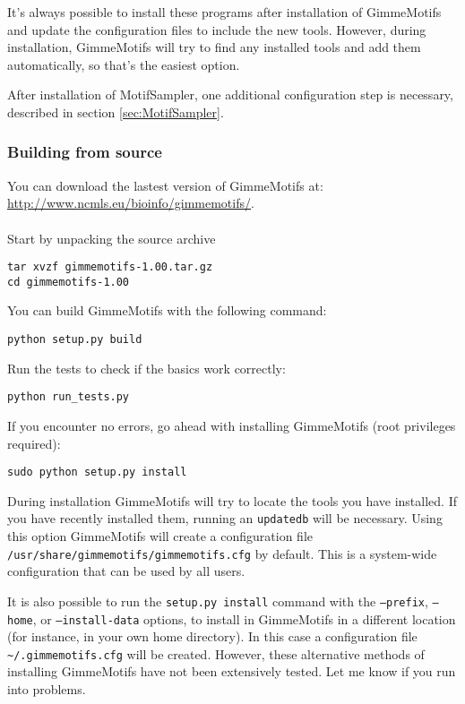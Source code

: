 \documentclass[10pt]{article}
\begin{document}
It's always possible to install these programs after installation of GimmeMotifs and update the configuration files to include the new tools. However, during installation, GimmeMotifs will try to find any installed tools and add them automatically, so that's the easiest option.

After installation of MotifSampler, one additional configuration step is necessary, described in section \ref{sec:MotifSampler}.


\subsubsection{Building from source}
You can download the lastest version of GimmeMotifs at:\\
\url{http://www.ncmls.eu/bioinfo/gimmemotifs/}. \\
\\
Start by unpacking the source archive
\begin{verbatim}
tar xvzf gimmemotifs-1.00.tar.gz
cd gimmemotifs-1.00
\end{verbatim}
You can build GimmeMotifs with the following command:
\begin{verbatim}
python setup.py build
\end{verbatim}
Run the tests to check if the basics work correctly:
\begin{verbatim}
python run_tests.py
\end{verbatim}
If you encounter no errors, go ahead with installing GimmeMotifs (root privileges required):
\begin{verbatim}
sudo python setup.py install
\end{verbatim}
During installation GimmeMotifs will try to locate the tools you have installed. If you have recently installed them, running an \texttt{updatedb} will be necessary. Using this option GimmeMotifs will create a configuration file \texttt{/usr/share/gimmemotifs/gimmemotifs.cfg} by default. This is a system-wide configuration that can be used by all users. 

It is also possible to run the \texttt{setup.py install} command with the \texttt{--prefix}, \texttt{--home}, or \texttt{--install-data} options, to install in GimmeMotifs in a different location (for instance, in your own home directory). In this case a configuration file \texttt{\textasciitilde{}/.gimmemotifs.cfg} will be created. However, these alternative methods of installing GimmeMotifs have not been extensively tested. Let me know if you run into problems.
\end{document}
